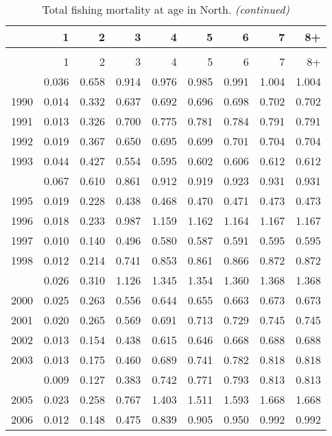 \documentclass[
]{article}
\begin{document}
\begin{longtable}[t]{lrrrrrrrr}
\caption{\label{tab:North-region-FAA-table}Total fishing mortality at age in North.}\\
\toprule
  & 1 & 2 & 3 & 4 & 5 & 6 & 7 & 8+\\
\midrule
\endfirsthead
\caption[]{Total fishing mortality at age in North. \textit{(continued)}}\\
\toprule
  & 1 & 2 & 3 & 4 & 5 & 6 & 7 & 8+\\
\midrule
\endhead

\endfoot
\bottomrule
\endlastfoot
1989 & 0.036 & 0.658 & 0.914 & 0.976 & 0.985 & 0.991 & 1.004 & 1.004\\
1990 & 0.014 & 0.332 & 0.637 & 0.692 & 0.696 & 0.698 & 0.702 & 0.702\\
1991 & 0.013 & 0.326 & 0.700 & 0.775 & 0.781 & 0.784 & 0.791 & 0.791\\
1992 & 0.019 & 0.367 & 0.650 & 0.695 & 0.699 & 0.701 & 0.704 & 0.704\\
1993 & 0.044 & 0.427 & 0.554 & 0.595 & 0.602 & 0.606 & 0.612 & 0.612\\
\addlinespace
1994 & 0.067 & 0.610 & 0.861 & 0.912 & 0.919 & 0.923 & 0.931 & 0.931\\
1995 & 0.019 & 0.228 & 0.438 & 0.468 & 0.470 & 0.471 & 0.473 & 0.473\\
1996 & 0.018 & 0.233 & 0.987 & 1.159 & 1.162 & 1.164 & 1.167 & 1.167\\
1997 & 0.010 & 0.140 & 0.496 & 0.580 & 0.587 & 0.591 & 0.595 & 0.595\\
1998 & 0.012 & 0.214 & 0.741 & 0.853 & 0.861 & 0.866 & 0.872 & 0.872\\
\addlinespace
1999 & 0.026 & 0.310 & 1.126 & 1.345 & 1.354 & 1.360 & 1.368 & 1.368\\
2000 & 0.025 & 0.263 & 0.556 & 0.644 & 0.655 & 0.663 & 0.673 & 0.673\\
2001 & 0.020 & 0.265 & 0.569 & 0.691 & 0.713 & 0.729 & 0.745 & 0.745\\
2002 & 0.013 & 0.154 & 0.438 & 0.615 & 0.646 & 0.668 & 0.688 & 0.688\\
2003 & 0.013 & 0.175 & 0.460 & 0.689 & 0.741 & 0.782 & 0.818 & 0.818\\
\addlinespace
2004 & 0.009 & 0.127 & 0.383 & 0.742 & 0.771 & 0.793 & 0.813 & 0.813\\
2005 & 0.023 & 0.258 & 0.767 & 1.403 & 1.511 & 1.593 & 1.668 & 1.668\\
2006 & 0.012 & 0.148 & 0.475 & 0.839 & 0.905 & 0.950 & 0.992 & 0.992\\

\end{longtable}
\end{document}
